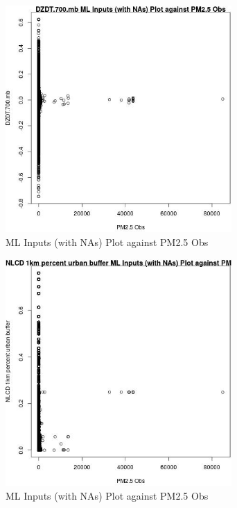 \begin{figure} 
\centering  
\includegraphics[width=0.77\textwidth]{Code_Outputs/Report_ML_input_PM25_Step4_part_f_de_duplicated_aveswNAs_DZDT700mbvPM25_Obs.jpg} 
\caption{\label{fig:Report_ML_input_PM25_Step4_part_f_de_duplicated_aveswNAsDZDT700mbvPM25_Obs}ML Inputs (with NAs) Plot against PM2.5 Obs} 
\end{figure} 
 

\begin{figure} 
\centering  
\includegraphics[width=0.77\textwidth]{Code_Outputs/Report_ML_input_PM25_Step4_part_f_de_duplicated_aveswNAs_NLCD_1km_percent_urban_buffervPM25_Obs.jpg} 
\caption{\label{fig:Report_ML_input_PM25_Step4_part_f_de_duplicated_aveswNAsNLCD_1km_percent_urban_buffervPM25_Obs}ML Inputs (with NAs) Plot against PM2.5 Obs} 
\end{figure} 
 

